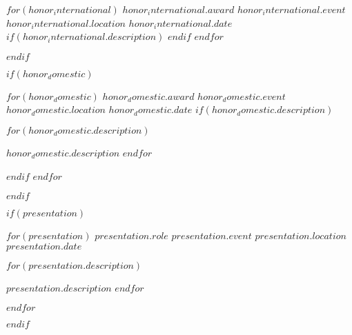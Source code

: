 \documentclass[11pt, a4paper]{awesome-cv}
\begin{document}
    \begin{cvhonors}
        $for(honor_international)$
        \cvhonor
        {$honor_international.award$} %
        {$honor_international.event$} %
        {$honor_international.location$} %
        {$honor_international.date$} %
        $if(honor_international.description)$
        { }
        $endif$
        $endfor$
    \end{cvhonors}
    $endif$

    $if(honor_domestic)$

    \begin{cvhonors}
        $for(honor_domestic)$
        \cvhonor
        {$honor_domestic.award$} %
        {$honor_domestic.event$} %
        {$honor_domestic.location$} %
        {$honor_domestic.date$} %
        $if(honor_domestic.description)$
        {
        \begin{cvitems}
            $for(honor_domestic.description)$
            \item {$honor_domestic.description$}
            $endfor$
        \end{cvitems}
        }
        $endif$
        $endfor$
    \end{cvhonors}
    $endif$


    $if(presentation)$

    \begin{cventries}
        $for(presentation)$
        \cventry
        {$presentation.role$} %
        {$presentation.event$} %
        {$presentation.location$} %
        {$presentation.date$} %
        {
        \begin{cvitems}
            $for(presentation.description)$
            \item {$presentation.description$}
            $endfor$
        \end{cvitems}
        }
        $endfor$
    \end{cventries}
    $endif$

\end{document}
